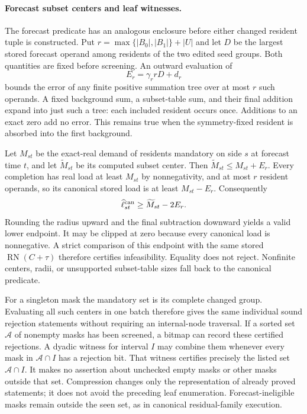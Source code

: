 \documentclass[11pt]{article}
\begin{document}
\paragraph{Forecast subset centers and leaf witnesses.}
The forecast predicate has an analogous enclosure before either changed resident tuple is constructed.  Put $r=\max\{|B_0|,|B_1|\}+|U|$ and let $D$ be the largest stored forecast operand among residents of the two edited seed groups.  Both quantities are fixed before screening.  An outward evaluation of
\[
 E_r=\gamma_r rD+d_r
\]
bounds the error of any finite positive summation tree over at most $r$ such operands.  A fixed background sum, a subset-table sum, and their final addition expand into just such a tree: each included resident occurs once.  Additions to an exact zero add no error.  This remains true when the symmetry-fixed resident is absorbed into the first background.

Let $M_{st}$ be the exact-real demand of residents mandatory on side $s$ at forecast time $t$, and let $\widetilde M_{st}$ be its computed subset center. Then $\widetilde M_{st}\le M_{st}+E_r$.  Every completion has real load at least $M_{st}$ by nonnegativity, and at most $r$ resident operands, so its canonical stored load is at least $M_{st}-E_r$.  Consequently
\[
 \widehat\ell^{\rm can}_{st}\ge
 \widetilde M_{st}-2E_r.
\]
Rounding the radius upward and the final subtraction downward yields a valid lower endpoint.  It may be clipped at zero because every canonical load is nonnegative.  A strict comparison of this endpoint with the same stored $\operatorname{RN}(C+\tau)$ therefore certifies infeasibility.  Equality does not reject.  Nonfinite centers, radii, or unsupported subset-table sizes fall back to the canonical predicate.

For a singleton mask the mandatory set is its complete changed group. Evaluating all such centers in one batch therefore gives the same individual sound rejection statements without requiring an internal-node traversal. If a sorted set $\mathcal A$ of nonempty masks has been screened, a bitmap can record these certified rejections.  A dyadic witness for interval $I$ may combine them whenever every mask in $\mathcal A\cap I$ has a rejection bit. That witness certifies precisely the listed set $\mathcal A\cap I$.  It makes no assertion about unchecked empty masks or other masks outside that set. Compression changes only the representation of already proved statements; it does not avoid the preceding leaf enumeration.  Forecast-ineligible masks remain outside the seen set, as in canonical residual-family execution.
\end{document}
